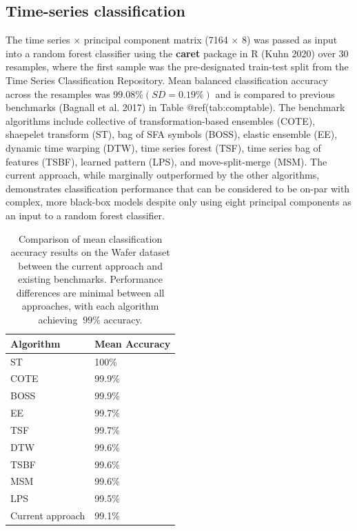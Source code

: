 \documentclass{article}
\begin{document}
\hypertarget{time-series-classification}{%
\subsection{Time-series
classification}\label{time-series-classification}}

The time series \(\times\) principal component matrix (7164 \(\times\)
8) was passed as input into a random forest classifier using the
\textbf{caret} package in R (Kuhn 2020) over 30 resamples, where the
first sample was the pre-designated train-test split from the Time
Series Classification Repository. Mean balanced classification accuracy
across the resamples was \(99.08\% (SD=0.19\%)\) and is compared to
previous benchmarks (Bagnall et al. 2017) in Table @ref(tab:comptable).
The benchmark algorithms include collective of transformation-based
ensembles (COTE), shaepelet transform (ST), bag of SFA symbols (BOSS),
elastic ensemble (EE), dynamic time warping (DTW), time series forest
(TSF), time series bag of features (TSBF), learned pattern (LPS), and
move-split-merge (MSM). The current approach, while marginally
outperformed by the other algorithms, demonstrates classification
performance that can be considered to be on-par with complex, more
black-box models despite only using eight principal components as an
input to a random forest classifier.

\begin{table}

\caption{\label{tab:comptable}Comparison of mean classification accuracy results on the Wafer dataset between the current approach and existing benchmarks. Performance differences are minimal between all approaches, with each algorithm achieving $\>99\%$ accuracy.}
\centering
\begin{tabular}[t]{l|l}
\hline
Algorithm & Mean Accuracy\\
\hline
ST & 100\%\\
\hline
COTE & 99.9\%\\
\hline
BOSS & 99.9\%\\
\hline
EE & 99.7\%\\
\hline
TSF & 99.7\%\\
\hline
DTW & 99.6\%\\
\hline
TSBF & 99.6\%\\
\hline
MSM & 99.6\%\\
\hline
LPS & 99.5\%\\
\hline
Current approach & 99.1\%\\
\hline
\end{tabular}
\end{table}
\end{document}
